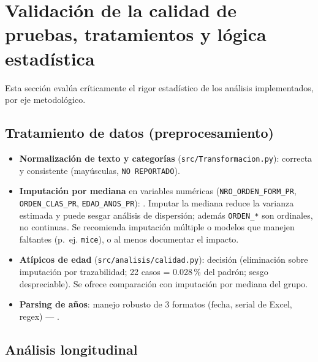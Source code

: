 
\section{Validación de la calidad de pruebas, tratamientos y lógica estadística}

Esta sección evalúa críticamente el rigor estadístico de los análisis
implementados, por eje metodológico.

\subsection{Tratamiento de datos (preprocesamiento)}

\begin{itemize}
  \item \textbf{Normalización de texto y categorías} (\texttt{src/Transformacion.py}):
        correcta y consistente (mayúsculas, \texttt{NO REPORTADO}).
  \item \textbf{Imputación por mediana} en variables numéricas
        (\texttt{NRO\_ORDEN\_FORM\_PR}, \texttt{ORDEN\_CLAS\_PR}, \texttt{EDAD\_ANOS\_PR}):
        . Imputar la mediana reduce la varianza estimada y
        puede sesgar análisis de dispersión; además \texttt{ORDEN\_*} son ordinales,
        no continuas. Se recomienda imputación múltiple o modelos que manejen
        faltantes (p.~ej. \texttt{mice}), o al menos documentar el impacto.
  \item \textbf{Atípicos de edad} (\texttt{src/analisis/calidad.py}): decisión
         (eliminación sobre imputación por
        trazabilidad; 22 casos = 0.028\,\% del padrón; sesgo despreciable). Se
        ofrece comparación con imputación por mediana del grupo.
  \item \textbf{Parsing de años}: manejo robusto de 3 formatos (fecha, serial de
        Excel, regex) — .
\end{itemize}

\subsection{Análisis longitudinal}

